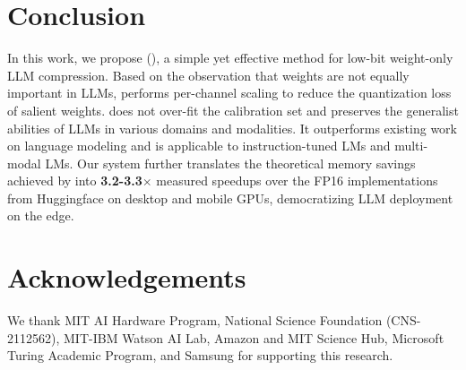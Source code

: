 \section{Conclusion}
In this work, we propose \method (\methodshort), a simple yet effective method for low-bit weight-only LLM compression.
Based on the observation that weights are not equally important in LLMs, \methodshort performs per-channel scaling to reduce the quantization loss of salient weights. \methodshort does not over-fit the calibration set and preserves the generalist abilities of LLMs in various domains and modalities. It outperforms existing work on language modeling and is applicable to instruction-tuned LMs and multi-modal LMs. Our \system system further translates the
theoretical memory savings achieved by \methodshort into \textbf{3.2-3.3$\times$} measured speedups over the FP16 implementations from Huggingface on desktop and mobile GPUs, democratizing LLM deployment on the edge.


\section*{Acknowledgements}
We thank MIT AI Hardware Program, National Science Foundation (CNS-2112562), MIT-IBM Watson AI Lab, Amazon and MIT Science Hub, Microsoft Turing Academic Program, and Samsung for supporting this research. 
